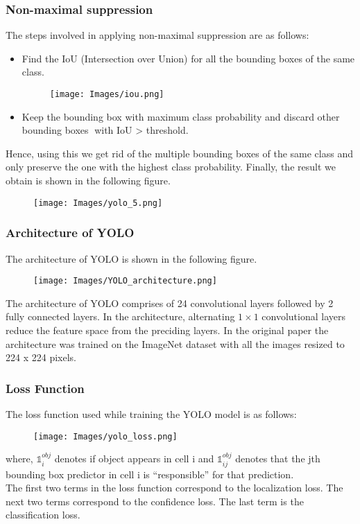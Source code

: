 \documentclass[conference]{IEEEtran}
\begin{document}
\subsubsection*{\textbf{Non-maximal suppression}}
The steps involved in applying non-maximal suppression are as follows:
\begin{itemize}
  \item Find the IoU (Intersection over Union) for all the bounding boxes of the same class.
        \begin{figure}[H]
          \centering
          \texttt{[image: Images/iou.png]}
        \end{figure}
  \item Keep the bounding box  with maximum class
        probability and discard other bounding boxes with IoU > threshold.
\end{itemize}
Hence, using this we get rid of the multiple bounding boxes of the same class and only preserve the one with the highest class probability. Finally, the result we obtain is shown in the following figure.
\begin{figure}[H]
  \centering
  \texttt{[image: Images/yolo\_5.png]}
\end{figure}

\subsubsection*{\textbf{Architecture of YOLO}}
The architecture of YOLO is shown in the following figure.
\begin{figure}[H]
  \centering
  \texttt{[image: Images/YOLO\_architecture.png]}
\end{figure}

The architecture of YOLO comprises of 24 convolutional layers followed by 2 fully connected layers. In the architecture, alternating $1\times 1$  convolutional layers reduce the feature space from the preciding layers. In the original paper the architecture  was trained on the ImageNet dataset with all the images resized to 224 x 224 pixels.

\subsubsection*{\textbf{Loss Function}}
The loss function used while training the YOLO model is as follows:
\begin{figure}[H]
  \centering
  \texttt{[image: Images/yolo\_loss.png]}
\end{figure}
where, $\mathbb{1} _{i}^{obj}$  denotes if object appears in cell i and $\mathbb{1} _{ij}^{obj}$ denotes that the jth bounding box predictor in cell i is “responsible” for that prediction.  \\
The first two terms in the loss function correspond to the localization loss. The next two terms correspond to the confidence loss. The last term is the classification loss.
\end{document}

